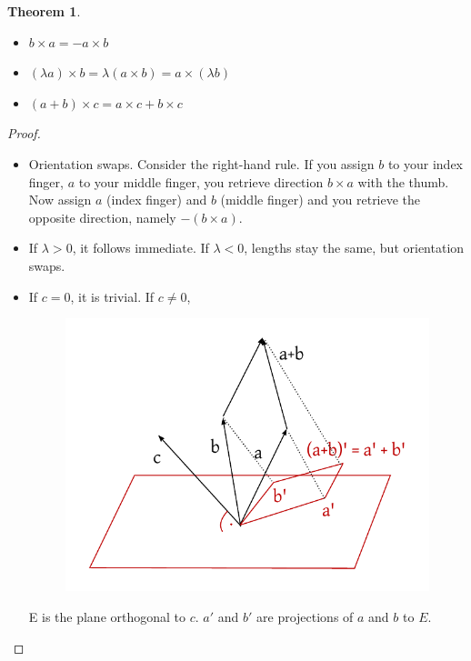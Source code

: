 \documentclass{article}
\newtheorem{theorem}{Theorem}  \numberwithin{theorem}{section}
\begin{document}
\begin{theorem}
  \begin{itemize}
    \item $b \times a = -a \times b$
    \item $(\lambda a) \times b = \lambda (a \times b) = a \times (\lambda b)$
    \item $(a + b) \times c = a \times c + b \times c$
  \end{itemize}
\end{theorem}

\begin{proof}
  \begin{itemize}
    \item Orientation swaps. Consider the right-hand rule. If you assign $b$ to your index finger, $a$ to your middle finger, you retrieve direction $b \times a$ with the thumb. Now assign $a$ (index finger) and $b$ (middle finger) and you retrieve the opposite direction, namely $- \left(b \times a\right)$.
    \item If $\lambda > 0$, it follows immediate.
      If $\lambda < 0$, lengths stay the same, but orientation swaps.
    \item If $c = 0$, it is trivial. If $c \neq 0$,
      \begin{figure}[!h]
        \begin{center}
          \includegraphics{img/04_apbmc_eq_amcpbmc.pdf}
        \end{center}
      \end{figure}
      E is the plane orthogonal to $c$. $a'$ and $b'$ are projections of $a$ and $b$ to $E$.


\end{itemize}
\end{proof}
\end{document}
